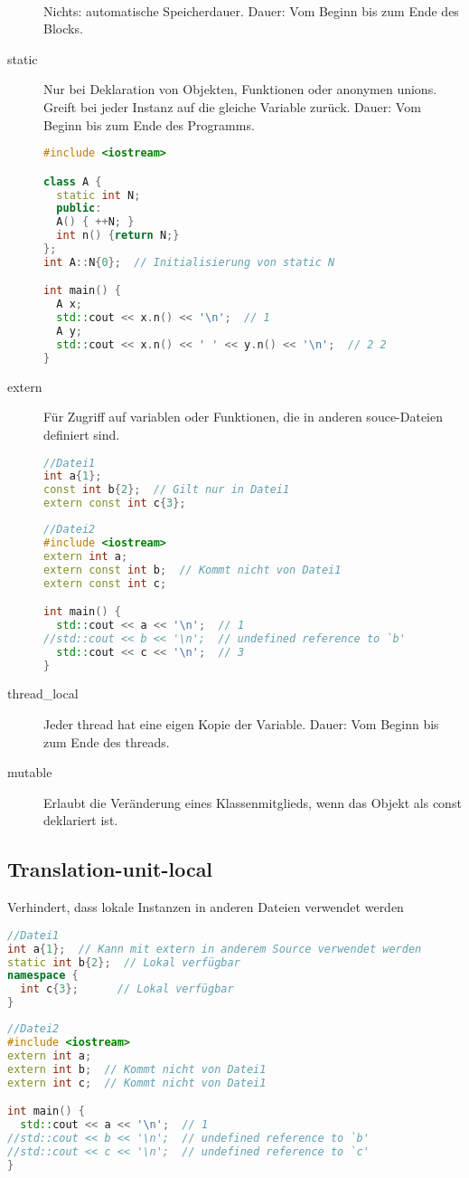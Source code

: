 \documentclass[10pt,twocolumn]{scrartcl}
\begin{document}
\begin{description}
  \item[~] Nichts: automatische Speicherdauer. Dauer: Vom Beginn bis zum Ende des Blocks.
  \item[static] Nur bei Deklaration von Objekten, Funktionen oder anonymen
  unions. Greift bei jeder Instanz auf die gleiche Variable zurück. Dauer: Vom Beginn bis zum Ende des Programms.

\begin{lstlisting}[language=C++]
#include <iostream>

class A {
  static int N;
  public:
  A() { ++N; }
  int n() {return N;}
};
int A::N{0};  // Initialisierung von static N

int main() {
  A x;
  std::cout << x.n() << '\n';  // 1
  A y;
  std::cout << x.n() << ' ' << y.n() << '\n';  // 2 2
}
\end{lstlisting}

  \item[extern] Für Zugriff auf variablen oder Funktionen, die in anderen souce-Dateien definiert sind.

\begin{lstlisting}[language=C++]
//Datei1
int a{1};
const int b{2};  // Gilt nur in Datei1
extern const int c{3};
\end{lstlisting}
\begin{lstlisting}[language=C++]
//Datei2
#include <iostream>
extern int a;
extern const int b;  // Kommt nicht von Datei1
extern const int c;

int main() {
  std::cout << a << '\n';  // 1
//std::cout << b << '\n';  // undefined reference to `b'
  std::cout << c << '\n';  // 3
}
\end{lstlisting}

  \item[thread\_local] Jeder thread hat eine eigen Kopie der Variable. Dauer: Vom Beginn bis zum Ende des threads.
  \item[mutable] Erlaubt die Veränderung eines Klassenmitglieds, wenn das Objekt als const deklariert ist.
\end{description}

\subsection{Translation-unit-local}

Verhindert, dass lokale Instanzen in anderen Dateien verwendet werden

\begin{lstlisting}[language=C++]
//Datei1
int a{1};  // Kann mit extern in anderem Source verwendet werden
static int b{2};  // Lokal verfügbar
namespace {
  int c{3};      // Lokal verfügbar
}
\end{lstlisting}
\begin{lstlisting}[language=C++]
//Datei2
#include <iostream>
extern int a;
extern int b;  // Kommt nicht von Datei1
extern int c;  // Kommt nicht von Datei1

int main() {
  std::cout << a << '\n';  // 1
//std::cout << b << '\n';  // undefined reference to `b'
//std::cout << c << '\n';  // undefined reference to `c'
}
\end{lstlisting}
\end{document}
